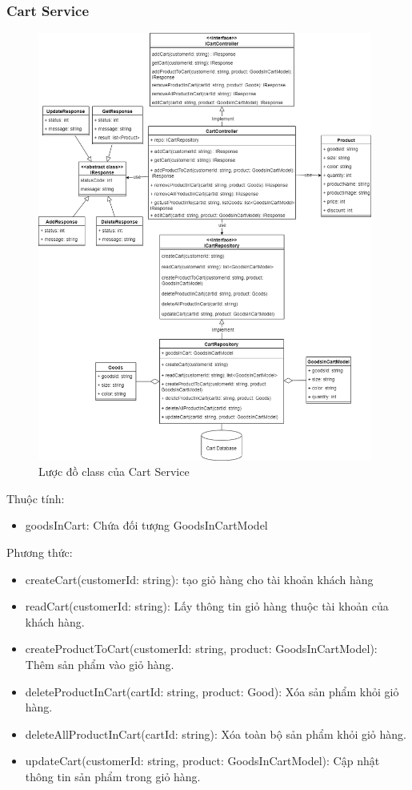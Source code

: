 \subsubsection{Cart Service}
\begin{figure}[!htp]
	\centering
	\includegraphics[width=11cm]{img/Architecture/service/CartService.png}
	\newline
	\caption{Lược đồ class của Cart Service}
\end{figure}

Thuộc tính:
\begin{itemize}
	\item goodsInCart: Chứa đối tượng GoodsInCartModel
\end{itemize}
Phương thức:
\begin{itemize}
	\item createCart(customerId: string): tạo giỏ hàng cho tài khoản khách hàng
	\item readCart(customerId: string): Lấy thông tin giỏ hàng thuộc tài khoản của khách hàng.
	\item createProductToCart(customerId: string, product: GoodsInCartModel): Thêm sản phẩm vào giỏ hàng.
	\item deleteProductInCart(cartId: string, product: Good): Xóa sản phẩm khỏi giỏ hàng.
	\item deleteAllProductInCart(cartId: string): Xóa toàn bộ sản phẩm khỏi giỏ hàng.
	\item updateCart(customerId: string, product: GoodsInCartModel): Cập nhật thông tin sản phẩm trong giỏ hàng.
\end{itemize}


